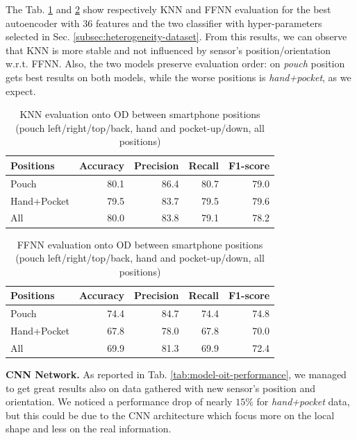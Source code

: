 The Tab. \ref{tab:knn-metrics} and \ref{tab:ffnn-metrics} show
respectively KNN and FFNN evaluation for the best autoencoder with
$36$ features and the two classifier with hyper-parameters selected in
Sec. \ref{subsec:heterogeneity-dataset}. From this results, we can
observe that KNN is more stable and not influenced by sensor's
position/orientation w.r.t. FFNN. Also, the two models preserve
evaluation order: on \textit{pouch} position gets best results on both
models, while the worse positions is \textit{hand+pocket}, as we
expect.

\begin{table}[h]
  \centering
  \begin{tabular}{lrrrr}
    \hline
    Positions & Accuracy & Precision & Recall & F1-score \\
    \hline
    Pouch & 80.1 & 86.4 & 80.7 & 79.0 \\
    Hand+Pocket & 79.5 & 83.7 & 79.5 & 79.6 \\
    All & 80.0 & 83.8 & 79.1 & 78.2 \\
    \hline
  \end{tabular}
  \caption{KNN evaluation onto OD between smartphone positions (pouch
    left/right/top/back, hand and pocket-up/down, all positions)}
  \label{tab:knn-metrics}
\end{table}

\begin{table}[h]
  \centering
  \begin{tabular}{lrrrr}
    \hline
    Positions & Accuracy & Precision & Recall & F1-score \\
    \hline
    Pouch & 74.4 & 84.7 & 74.4 & 74.8 \\
    Hand+Pocket & 67.8 & 78.0 & 67.8 & 70.0 \\
    All & 69.9 & 81.3 & 69.9 & 72.4 \\
    \hline
  \end{tabular}
  \caption{FFNN evaluation onto OD between smartphone positions (pouch
    left/right/top/back, hand and pocket-up/down, all positions)}
  \label{tab:ffnn-metrics}
\end{table}

\textbf{CNN Network.}  As reported in
Tab. \ref{tab:model-oit-performance}, we managed to get great results
also on data gathered with new sensor's position and orientation. We
noticed a performance drop of nearly $15\%$ for \textit{hand+pocket}
data, but this could be due to the CNN architecture which focus more
on the local shape and less on the real information.

